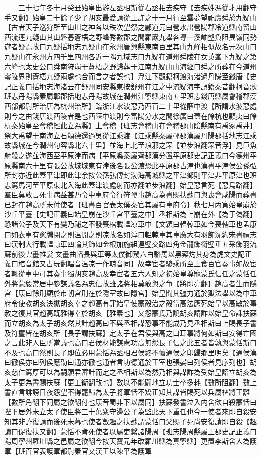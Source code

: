 　　三十七年冬十月癸丑始皇出游左丞相斯從右丞相去疾守【去疾姓馮從才用翻守手又翻】始皇二十餘子少子胡亥最愛請從上許之十一月行至雲夢望祀虞舜於九疑山【古者天子巡狩所至山川之神各以秩次望祭之酈道元曰營水出營陽郡冷道縣南留山西流逕九疑山其山磐碁蒼梧之野峰秀數郡之間羅巖九舉各導一溪岫壑負阻異嶺同勢遊者疑焉故曰九疑括地志九疑山在永州唐興縣東南百里其山九峰相似故名元次山曰九疑山在永州方四千里四州各近一隅九域志曰九疑在道州舜陵在女英峯下九疑之第六峰也太史公曰舜南狩崩于蒼梧之野歸葬于江南九疑山山海經曰舜之所葬在今道州零陵界則蒼梧九疑兩處也合而言之者誤也】浮江下觀籍柯渡海渚過丹陽至錢唐【史記正義曰括地志海渚云在舒州同安縣東按舒州在江之中流疑海字誤籍秦昔翻柯音歌班志丹陽縣秦屬鄣郡括地志丹陽故城在潤州江寧縣東南五里班志錢唐縣屬會稽郡漢西部都尉所治唐為杭州治所】臨浙江水波惡乃西百二十里從陿中渡【所謂水波惡處則今之由錢唐渡西陵者是也西陿中渡則今富陽分水之間徐廣曰蓋在餘杭也顧夷曰餘杭秦始皇至會稽經此立為縣】上會稽【班志會稽山在會稽郡山隂縣南有禹冢禹井】祭大禹望于南海立石頌德還過吳從江乘渡【江乘縣秦屬鄣郡漢屬丹陽郡括地志江乘故縣城在今潤州句容縣北六十里】並海上北至琅邪之罘【並步浪翻罘音浮】見巨魚射殺之遂並海西至平原津而病【平原縣秦屬齊郡漢分置平原郡史記正義曰今德州平原縣南六十里有張公故城城東有津後名張公渡恐此平原郡古津也漢書平津侯公孫弘所封亦近此蓋平津即此津余按公孫弘傳封渤海高城縣之平津鄉則平津非平原津也班志篤馬河至平原東北入海此蓋津渡處射而亦翻並步浪翻】始皇惡言死【惡烏路翻】羣臣莫敢言死事病益甚乃令中車府令行符璽事趙高為書賜扶蘇曰與喪會咸陽而葬書已封在趙高所未付使者【班書百官表太僕秦官其屬有車府令】秋七月丙寅始皇崩於沙丘平臺【史記正義曰始皇崩在沙丘宫平臺之中】丞相斯為上崩在外【為于偽翻】恐諸公子及天下有變乃祕之不發喪棺載輼凉車中【文穎曰輼輬車如今喪轜車也孟康曰如衣車有窻牖閉之則温開之則凉故名如淳曰輼輬車其車廣大有羽飾沈約宋書禮志曰漢制大行載輼輬車四輪其飾如金根加施組連璧交路四角金龍飾銜璧垂五采飾羽流蘇前後雲畫帷裳文畫曲轓長與車等太僕御駕六白駱馬以黑藥灼其身為虎文史記正義曰棺音館又古玩翻輼音温凉一作輬音同】故幸宦者驂乘所至上食百官奏事如故宦者輒從車中可其奏事獨胡亥趙高及幸宦者五六人知之初始皇尊寵蒙氏信任之蒙恬任外將蒙毅常居中參謀議名為忠信故雖諸將相莫敢與之争【將即亮翻】趙高者生而隱宫【康曰餘刑顯於市朝宫刑在於隱室故曰隱宫】始皇聞其彊力通於獄法舉以為中車府令使教胡亥決獄胡亥幸之趙高有罪始皇使蒙毅治之毅當高法應死始皇以高敏於事赦之復其官趙高既雅得幸於胡亥【雅素也】又怨蒙氏乃說胡亥請詐以始皇命誅扶蘇而立胡亥為太子胡亥然其計趙高曰不與丞相謀恐事不能成乃見丞相斯曰上賜長子書及符璽皆在胡亥所【長子謂扶蘇】定太子在君侯與高之口耳事將何如斯曰安得亡國之言此非人臣所當議也高曰君侯材能謀慮功高無怨長子信之此五者皆孰與蒙恬斯曰不及也高曰然則長子即位必用蒙恬為丞相君侯終不懷通侯之印歸鄉里明矣【通侯漢曰徹侯亦曰列侯應劭曰通亦徹也通者言功德通於王室也張晏曰列侯者見序列也】胡亥慈仁篤厚可以為嗣願君審計而定之丞相斯以為然乃相與謀詐為受始皇詔立胡亥為太子更為書賜扶蘇【更工衡翻改也】數以不能闢地立功士卒多耗【數所阻翻】數上書直言誹謗日夜怨望不得罷歸為太子將軍恬不矯正知其謀皆賜死以兵屬禆將王離【數所角翻下同屬之欲翻付也康音蜀非下以屬同】扶蘇發書泣入内舍欲自殺蒙恬曰陛下居外未立太子使臣將三十萬衆守邊公子為監此天下重任也今一使者來即自殺安知其非詐復請而後死未暮也使者數趣之扶蘇謂蒙恬曰父賜子死尚安復請即自殺【趣讀曰促復扶又翻】蒙恬不肯死使者以屬吏繫諸陽周【班志陽周縣屬上郡史記正義曰陽周寧州羅川縣之邑屬之欲翻今按天寶元年改羅川縣為真寧縣】更置李斯舍人為護軍【班百官表護軍都尉秦官又漢王以陳平為護軍